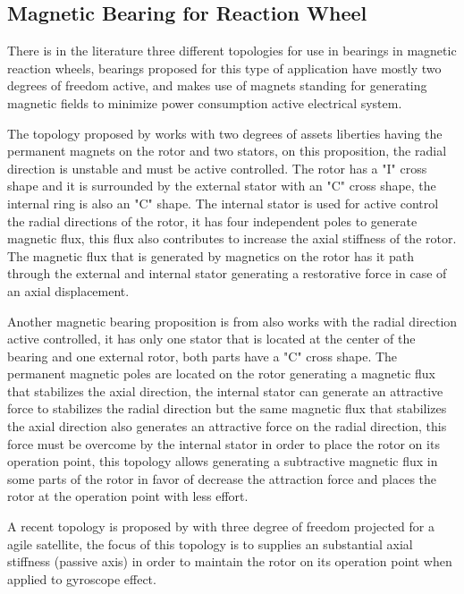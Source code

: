 \documentclass[10pt,fleqn,a4paper,twoside]{article}
\begin{document}
	\subsection{Magnetic Bearing for Reaction Wheel}
	
	There is in the literature three different topologies for use in bearings in magnetic reaction wheels, bearings proposed for this type of application have mostly two degrees of freedom active, and makes use of magnets standing for generating magnetic fields to minimize power consumption active electrical system. 
	
	The topology proposed by \cite{Bernus 1998} works with two degrees of assets liberties having the permanent magnets on the rotor and two stators, on this proposition, the radial direction is unstable and must be active controlled. The rotor has a "I" cross shape and it is surrounded by the external stator with an "C" cross shape, the internal ring is also an "C" shape. The internal stator is used for active control the radial directions of the rotor, it has four independent poles to generate magnetic flux, this flux also contributes to increase the axial stiffness of the rotor. The magnetic flux that is generated by magnetics on the rotor has it path through the external and internal stator generating a restorative force in case of an axial displacement.
	
	Another magnetic bearing proposition is from \cite{Scharfe2001} also works with the radial direction active controlled, it has only one stator that is located at the center of the bearing and one external rotor, both parts have a "C" cross shape. The permanent magnetic poles are located on the rotor generating a magnetic flux that stabilizes the axial direction, the internal stator can generate an attractive force to stabilizes the radial direction but the same magnetic flux that stabilizes the axial direction also generates an attractive force on the radial direction, this force must be overcome by the internal stator in order to place the rotor on its operation point, this topology allows generating a subtractive magnetic flux in some parts of the rotor in favor of decrease the attraction force and places the rotor at the operation point with less effort. 
	
	A recent topology is proposed by \cite{Bangcheng2012} with  three degree of freedom projected for a agile satellite, the focus of this topology is to supplies an substantial axial stiffness (passive axis) in order to maintain the rotor on its operation point when applied to  gyroscope effect.
		
\end{document}
